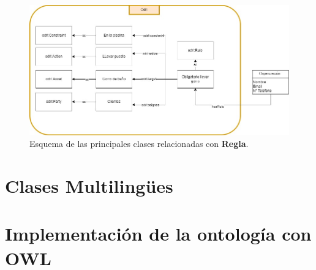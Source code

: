 \documentclass[a4paper,12pt]{article}
\begin{document}
	\begin{figure}[H]
		\centering
		\includegraphics[width=\textwidth]{include/reglas.jpg}
		\caption{Esquema de las principales clases relacionadas con \textbf{Regla}.}
	\end{figure}
	
	\section{Clases Multilingües}
	
	\section{Implementación de la ontología con OWL}
	
\end{document}
